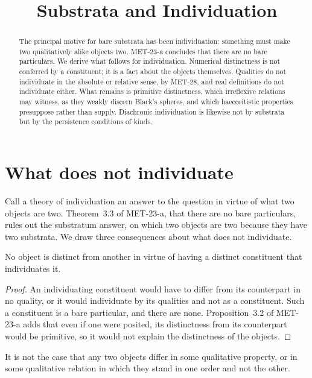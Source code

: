 \documentclass{situationist-preprint}
\title{Substrata and Individuation}
\begin{document}
\maketitle

\begin{abstract}
The principal motive for bare substrata has been individuation: something must make two qualitatively alike objects two. MET-23-a concludes that there are no bare particulars. We derive what follows for individuation. Numerical distinctness is not conferred by a constituent; it is a fact about the objects themselves. Qualities do not individuate in the absolute or relative sense, by MET-28, and real definitions do not individuate either. What remains is primitive distinctness, which irreflexive relations may witness, as they weakly discern Black's spheres, and which haecceitistic properties presuppose rather than supply. Diachronic individuation is likewise not by substrata but by the persistence conditions of kinds.
\end{abstract}

\section{What does not individuate}

Call a theory of individuation an answer to the question in virtue of what two objects are two. Theorem~3.3 of MET-23-a, that there are no bare particulars, rules out the substratum answer, on which two objects are two because they have two substrata. We draw three consequences about what does not individuate.

\begin{corollary}\label{c:constituent}
No object is distinct from another in virtue of having a distinct constituent that individuates it.
\end{corollary}

\begin{proof}
An individuating constituent would have to differ from its counterpart in no quality, or it would individuate by its qualities and not as a constituent. Such a constituent is a bare particular, and there are none. Proposition~3.2 of MET-23-a adds that even if one were posited, its distinctness from its counterpart would be primitive, so it would not explain the distinctness of the objects.
\end{proof}

\begin{corollary}\label{c:qual}
It is not the case that any two objects differ in some qualitative property, or in some qualitative relation in which they stand in one order and not the other.
\end{corollary}
\end{document}
